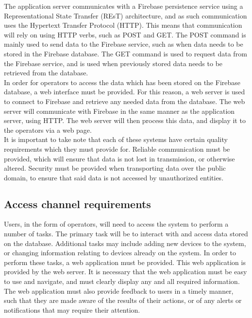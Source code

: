 \documentclass{article}
\begin{document}
	The application server communicates with a Firebase persistence 
	service using a Representational State Transfer (REsT) architecture, 
	and as such communication uses the Hypertext Transfer Protocol 
	(HTTP). This means that communication will rely on using HTTP verbs, 
	such as POST and GET. The POST command is mainly used to send data to 
	the Firebase service, such as when data needs to be stored in the 
	Firebase database. The GET command is used to request data from the 
	Firebase service, and is used when previously stored data needs to be 
	retrieved from the database.\\
	
	In order for operators to access the data which has been stored on 
	the Firebase database, a web interface must be provided. For this 
	reason, a web server is used to connect to Firebase and retrieve any 
	needed data from the database. The web server will communicate with 
	Firebase in the same manner as the application server, using HTTP. 
	The web server will then process this data, and display it to the 
	operators via a web page.\\
	
	It is important to take note that each of these systems have certain 
	quality requirements which they must provide for. Reliable 
	communication must be provided, which will ensure that data is not 
	lost in transmission, or otherwise altered. Security must be provided 
	when transporting data over the public domain, to ensure that said 
	data is not accessed by unauthorized entities.
	
	\newpage
	
	\subsection{Access channel requirements}
	
	Users, in the form of operators, will need to access the system to 
	perform a number of tasks. The primary task will be to interact with 
	and access data stored on the database. Additional tasks may include 
	adding new devices to the system, or changing information relating to 
	devices already on the system. In order to perform these tasks, a web 
	application must be provided. This web application is provided by the 
	web server. It is necessary that the web application must be easy to 
	use and navigate, and must clearly display any and all required 
	information. The web application must also provide feedback to users 
	in a timely manner, such that they are made aware of the results of 
	their actions, or of any alerts or notifications that may require 
	their attention.\\
	
\end{document}
